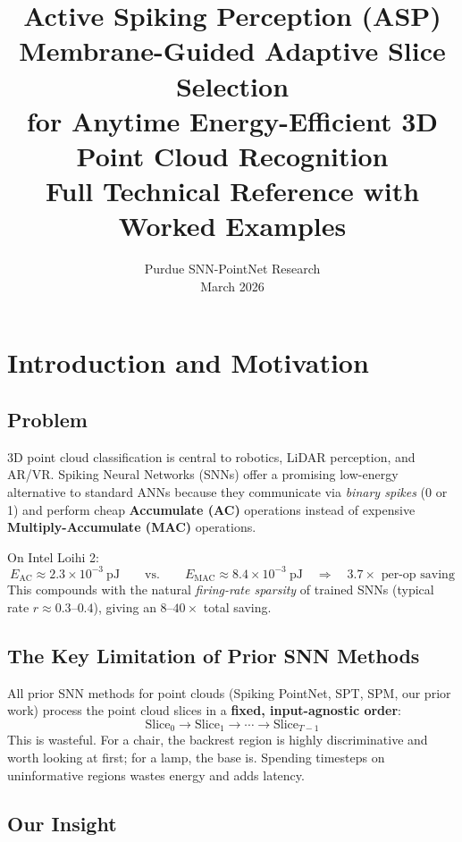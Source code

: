 \documentclass[11pt,a4paper]{article}
\title{\textbf{Active Spiking Perception (ASP)}\\
       \large Membrane-Guided Adaptive Slice Selection\\
       for Anytime Energy-Efficient 3D Point Cloud Recognition\\[6pt]
       \normalsize Full Technical Reference with Worked Examples}
\author{Purdue SNN-PointNet Research \\ March 2026}
\date{}
\begin{document}
\maketitle
\tableofcontents
\newpage

\section{Introduction and Motivation}

\subsection{Problem}

3D point cloud classification is central to robotics, LiDAR perception, and
AR/VR. Spiking Neural Networks (SNNs) offer a promising low-energy alternative
to standard ANNs because they communicate via \emph{binary spikes} (0 or 1)
and perform cheap \textbf{Accumulate (AC)} operations instead of expensive
\textbf{Multiply-Accumulate (MAC)} operations.

On Intel Loihi 2:
\[
  E_{\text{AC}} \approx 2.3 \times 10^{-3}\ \text{pJ}
  \qquad \text{vs.} \qquad
  E_{\text{MAC}} \approx 8.4 \times 10^{-3}\ \text{pJ}
  \quad\Rightarrow\quad 3.7\times\text{ per-op saving}
\]
This compounds with the natural \emph{firing-rate sparsity} of trained SNNs
(typical rate $r \approx 0.3$--$0.4$), giving an $8$--$40\times$ total saving.

\subsection{The Key Limitation of Prior SNN Methods}

All prior SNN methods for point clouds (Spiking PointNet, SPT, SPM, our prior
work) process the point cloud slices in a \textbf{fixed, input-agnostic order}:
\[
  \text{Slice}_0 \to \text{Slice}_1 \to \cdots \to \text{Slice}_{T-1}
\]
This is wasteful.  For a chair, the backrest region is highly discriminative
and worth looking at first; for a lamp, the base is.  Spending timesteps on
uninformative regions wastes energy and adds latency.

\subsection{Our Insight}
\end{document}
